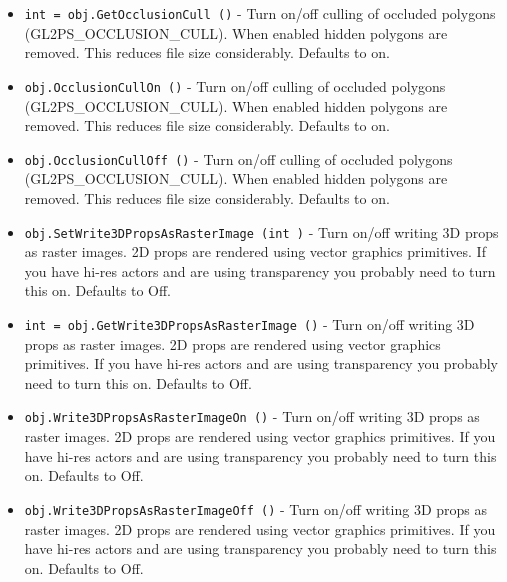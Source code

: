 \begin{itemize}
\item  \verb|int = obj.GetOcclusionCull ()| -  Turn on/off culling of occluded polygons (GL2PS\_OCCLUSION\_CULL).
 When enabled hidden polygons are removed.  This reduces file size
 considerably.  Defaults to on.

\item  \verb|obj.OcclusionCullOn ()| -  Turn on/off culling of occluded polygons (GL2PS\_OCCLUSION\_CULL).
 When enabled hidden polygons are removed.  This reduces file size
 considerably.  Defaults to on.

\item  \verb|obj.OcclusionCullOff ()| -  Turn on/off culling of occluded polygons (GL2PS\_OCCLUSION\_CULL).
 When enabled hidden polygons are removed.  This reduces file size
 considerably.  Defaults to on.

\item  \verb|obj.SetWrite3DPropsAsRasterImage (int )| -  Turn on/off writing 3D props as raster images.  2D props are
 rendered using vector graphics primitives.  If you have hi-res
 actors and are using transparency you probably need to turn this
 on.  Defaults to Off.

\item  \verb|int = obj.GetWrite3DPropsAsRasterImage ()| -  Turn on/off writing 3D props as raster images.  2D props are
 rendered using vector graphics primitives.  If you have hi-res
 actors and are using transparency you probably need to turn this
 on.  Defaults to Off.

\item  \verb|obj.Write3DPropsAsRasterImageOn ()| -  Turn on/off writing 3D props as raster images.  2D props are
 rendered using vector graphics primitives.  If you have hi-res
 actors and are using transparency you probably need to turn this
 on.  Defaults to Off.

\item  \verb|obj.Write3DPropsAsRasterImageOff ()| -  Turn on/off writing 3D props as raster images.  2D props are
 rendered using vector graphics primitives.  If you have hi-res
 actors and are using transparency you probably need to turn this
 on.  Defaults to Off.

\end{itemize}
